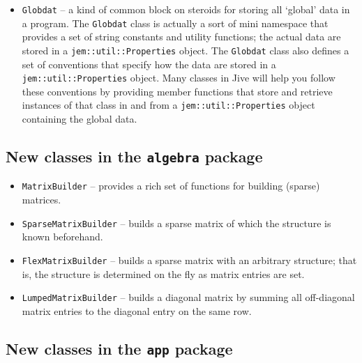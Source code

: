 \documentclass[a4paper,11pt]{article}
\newcommand{\Code}[1]{\texttt{#1}}
\begin{document}
\begin{itemize}
\item \Code{Globdat} -- a kind of common block on steroids for storing
  all `global' data in a program. The \Code{Globdat} class is actually
  a sort of mini namespace that provides a set of string constants and
  utility functions; the actual data are stored in a
  \Code{jem::util::Properties} object. The \Code{Globdat} class also
  defines a set of conventions that specify how the data are stored in
  a \Code{jem::\-util::\-Properties} object. Many classes in Jive will
  help you follow these conventions by providing member functions that
  store and retrieve instances of that class in and from a
  \Code{jem::\-util::\-Properties} object containing the global data.

\end{itemize}



\subsection{New classes in the \Code{algebra} package}

\begin{itemize}

\item \Code{MatrixBuilder} -- provides a rich set of functions for
  building (sparse) matrices.

\item \Code{SparseMatrixBuilder} -- builds a sparse matrix of which
  the structure is known beforehand.

\item \Code{FlexMatrixBuilder} -- builds a sparse matrix with an
  arbitrary structure; that is, the structure is determined on the fly
  as matrix entries are set.

\item \Code{LumpedMatrixBuilder} -- builds a diagonal matrix by
  summing all off-diagonal matrix entries to the diagonal entry on
  the same row.

\end{itemize}



\subsection{New classes in the \Code{app} package}
\end{document}
